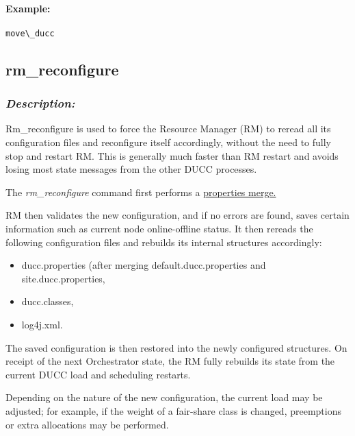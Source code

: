     \paragraph{Example:}
\begin{verbatim}
move\_ducc 
\end{verbatim}


\subsection{rm\_reconfigure}
\label{subsec:admin.rm-reconfigure}

    \subsubsection{{\em Description:}}
    Rm\_reconfigure is used to force the Resource Manager (RM) to reread all its configuration
    files and reconfigure itself accordingly, without the need to fully stop and restart RM.
    This is generally much faster than RM restart and avoids losing most state messages from
    the other DUCC processes.
    
    The {\em rm\_reconfigure} command first performs a 
    \hyperref[sec:admin.properties-merge]{properties merge.}

    RM then validates the new
    configuration, and if no errors are found, saves certain information such as current node
    online-offline status.  It then rereads the following configuration files and rebuilds its
    internal structures accordingly:
    \begin{itemize}
      \item ducc.properties (after merging default.ducc.properties and site.ducc.properties,
      \item ducc.classes,
      \item log4j.xml.
    \end{itemize}
    The saved configuration is then restored into the newly configured structures.
    On receipt of the next Orchestrator state, the RM fully rebuilds its state from the current
    DUCC load and scheduling restarts.

    Depending on the nature of the new configuration, the current load may be adjusted; for
    example, if the weight of a fair-share class is changed, preemptions or extra allocations
    may be performed.

